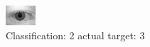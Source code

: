 \begin{figure}[h!]
\begin{center}
\includegraphics[width=0.60\columnwidth]{figures/ID656_class_2_target_3.png}
\end{center}
\caption{ Classification: 2 actual target: 3}
\label{fig:ID656_class_2_target_3}
\end{figure}
